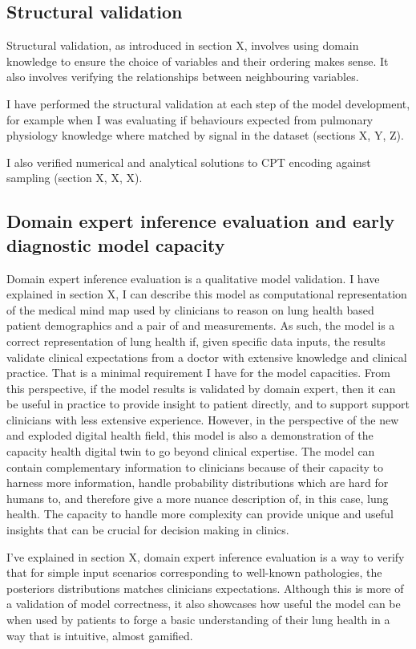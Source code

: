 \subsection{Structural validation}
Structural validation, as introduced in section X, involves using domain knowledge to ensure the choice of variables and their ordering makes sense. It also involves verifying the relationships between neighbouring variables. 

I have performed the structural validation at each step of the model development, for example when I was evaluating if behaviours expected from pulmonary physiology knowledge where matched by signal in the dataset (sections X, Y, Z). 

I also verified numerical and analytical solutions to CPT encoding against sampling (section X, X, X).

\subsection{Domain expert inference evaluation and early diagnostic model capacity}
Domain expert inference evaluation is a qualitative model validation. I have explained in section X, I can describe this model as computational representation of the medical mind map used by clinicians to reason on lung health based patient demographics and a pair of \F and \OXSat measurements. As such, the model is a correct representation of lung health if, given specific data inputs, the results validate clinical expectations from a doctor with extensive knowledge and clinical practice. That is a minimal requirement I have for the model capacities. From this perspective, if the model results is validated by domain expert, then it can be useful in practice to provide insight to patient directly, and to support support clinicians with less extensive experience.
However, in the perspective of the new and exploded digital health field, this model is also a demonstration of the capacity health digital twin to go beyond clinical expertise. The model can contain complementary information to clinicians because of their capacity to harness more information, handle probability distributions which are hard for humans to, and therefore give a more nuance description of, in this case, lung health. The capacity to handle more complexity can provide unique and useful insights that can be crucial for decision making in clinics.

I've explained in section X, domain expert inference evaluation is a way to verify that for simple input scenarios corresponding to well-known pathologies, the posteriors distributions matches clinicians expectations. Although this is more of a validation of model correctness, it also showcases how useful the model can be when used by patients to forge a basic understanding of their lung health in a way that is intuitive, almost gamified.

